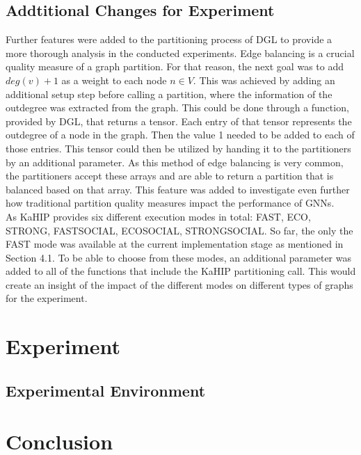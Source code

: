 \documentclass[acmsmall,nonacm,screen,review]{acmart}
\begin{document}
\subsection{Addtitional Changes for Experiment}
Further features were added to the partitioning process of DGL to provide a more thorough analysis in the conducted experiments. Edge balancing is a crucial quality measure of a graph partition. For that reason, the next goal was to add $deg(v) + 1$ as a weight to each node $n \in V$. This was achieved by adding an additional setup step before calling a partition, where the information of the outdegree was extracted from the graph. This could be done through a function, provided by DGL, that returns a tensor. Each entry of that tensor represents the outdegree of a node in the graph. Then the value 1 needed to be added to each of those entries. This tensor could then be utilized by handing it to the partitioners by an additional parameter. As this method of edge balancing is very common, the partitioners accept these arrays and are able to return a partition that is balanced based on that array. This feature was added to investigate even further how traditional partition quality measures impact the performance of GNNs. \\
As KaHIP provides six different execution modes in total: FAST, ECO, STRONG, FASTSOCIAL, ECOSOCIAL, STRONGSOCIAL. So far, the only the FAST mode was available at the current implementation stage as mentioned in Section 4.1. To be able to choose from these modes, an additional parameter was added to all of the functions that include the KaHIP partitioning call. This would create an insight of the impact of the different modes on different types of graphs for the experiment.
\section{Experiment}
\subsection{Experimental Environment}
\section{Conclusion}



\end{document}
